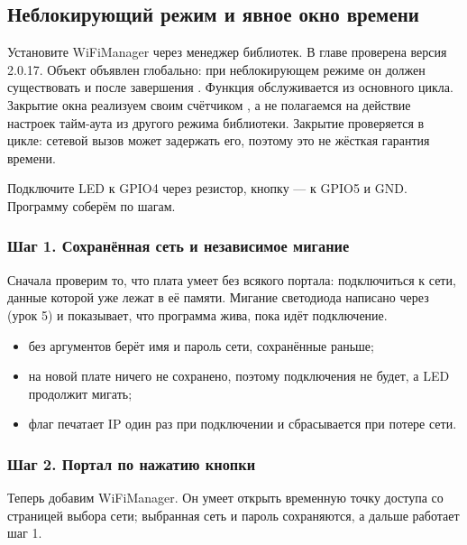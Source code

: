 \subsection{Неблокирующий режим и явное окно времени}

Установите WiFiManager через менеджер библиотек. В главе проверена версия 2.0.17.
Объект объявлен глобально: при неблокирующем режиме он должен существовать и после
завершения . Функция  обслуживается из основного цикла.
Закрытие окна реализуем своим счётчиком , а не полагаемся на действие
настроек тайм-аута из другого режима библиотеки. Закрытие проверяется в цикле: сетевой вызов
может задержать его, поэтому это не жёсткая гарантия времени.

Подключите LED к GPIO4 через резистор, кнопку --- к GPIO5 и GND. Программу соберём по шагам.

\subsubsection{Шаг 1. Сохранённая сеть и независимое мигание}

Сначала проверим то, что плата умеет без всякого портала: подключиться к сети, данные которой
уже лежат в её памяти. Мигание светодиода написано через  (урок 5) и показывает, что
программа жива, пока идёт подключение.


\begin{itemize}[leftmargin=*]
  \item {} без аргументов берёт имя и пароль сети, сохранённые раньше;
  \item на новой плате ничего не сохранено, поэтому подключения не будет, а LED продолжит мигать;
  \item флаг  печатает IP один раз при подключении и сбрасывается при потере сети.
\end{itemize}

\subsubsection{Шаг 2. Портал по нажатию кнопки}

Теперь добавим WiFiManager. Он умеет открыть временную точку доступа  со страницей
выбора сети; выбранная сеть и пароль сохраняются, а дальше работает шаг 1.

